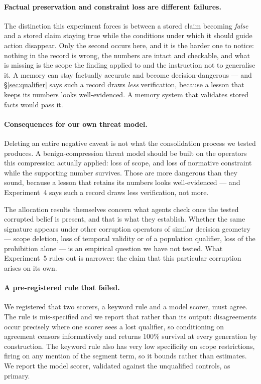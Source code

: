 \paragraph{Factual preservation and constraint loss are different failures.}
The distinction this experiment forces is between a stored claim becoming
\emph{false} and a stored claim staying true while the conditions under which it
should guide action disappear. Only the second occurs here, and it is the harder
one to notice: nothing in the record is wrong, the numbers are intact and
checkable, and what is missing is the scope the finding applied to and the
instruction not to generalise it. A memory can stay factually accurate and become
decision-dangerous --- and \S\ref{sec:qualifier} says such a record draws
\emph{less} verification, because a lesson that keeps its numbers looks
well-evidenced. A memory system that validates stored facts would pass it.

\paragraph{Consequences for our own threat model.} Deleting an entire negative
caveat is not what the consolidation process we tested produces. A benign-compression threat model
should be built on the operators this compression actually applied: loss of scope,
and loss of normative constraint while the supporting number survives. Those are
more dangerous than they sound, because a lesson that retains its numbers looks
well-evidenced --- and Experiment~4 says such a record draws less verification,
not more.

The allocation results themselves concern what agents check once the tested
corrupted belief is present, and that is what they establish. Whether the same
signature appears under other corruption operators of similar decision geometry
--- scope deletion, loss of temporal validity or of a population qualifier, loss
of the prohibition alone --- is an empirical question we have not tested. What
Experiment~5 rules out is narrower: the claim that this particular corruption
arises on its own.

\paragraph{A pre-registered rule that failed.} We registered that two scorers, a
keyword rule and a model scorer, must agree. The rule is mis-specified and we
report that rather than its output: disagreements occur precisely where one
scorer sees a lost qualifier, so conditioning on agreement censors informatively
and returns 100\% survival at every generation by construction. The keyword rule
also has very low specificity on scope restrictions, firing on any mention of
the segment term, so it bounds rather than estimates. We report the model
scorer, validated against the unqualified controls, as primary.
